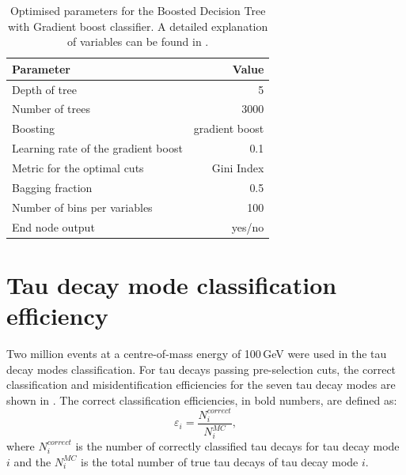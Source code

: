 


\begin{table}[!htbp]\centering
\begin{tabular}{lr}
\hline \hline
 Parameter &  Value \\
\hline
Depth of tree & 5 \\
Number of trees & 3000 \\
Boosting & gradient boost \\
Learning rate of the gradient boost & 0.1 \\
Metric for the optimal cuts & Gini Index \\
Bagging fraction & 0.5 \\
Number of bins per variables & 100 \\
End node output & yes/no \\
\hline \hline
\end{tabular}
\caption
{Optimised parameters for the Boosted Decision Tree with Gradient boost \multiclass classifier. A detailed explanation of variables can be found in .}
\label{tab:tauBDTparameters}
\end{table}


\section{Tau decay mode classification efficiency}
\label{sec:tauClassificationEff}

Two million \eeToTauTau events at a centre-of-mass energy of 100\,GeV were used in the tau decay modes classification. For tau decays passing pre-selection cuts, the correct classification and misidentification  efficiencies for the seven tau decay modes are shown in . The correct classification efficiencies, in bold numbers,  are defined as:
\begin{equation}
\varepsilon_i = \frac{N^{correct}_i}{N^{MC}_i},
\label{eqn:tauEff}
\end{equation}
where $N^{correct}_i$ is the number of correctly classified tau decays for tau decay mode $i$ and the $N^{MC}_i$ is the total number of true tau decays of tau decay mode $i$.



